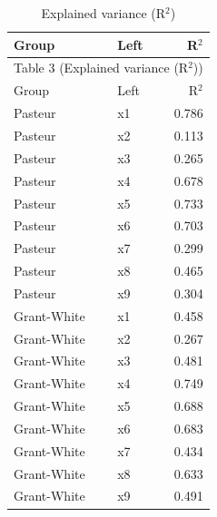 \documentclass[11pt]{article}
\begin{document}
\small
\begin{longtable}{llr}
\caption{Explained variance (R$^{2}$)}\\
\toprule
Group & Left & R$^{2}$ \\
\midrule
\endfirsthead
\multicolumn{3}{l}{Table 3 (Explained variance (R$^{2}$))} \\
\toprule
Group & Left & R$^{2}$ \\
\midrule
\endhead
Pasteur & x1 & 0.786 \\
Pasteur & x2 & 0.113 \\
Pasteur & x3 & 0.265 \\
Pasteur & x4 & 0.678 \\
Pasteur & x5 & 0.733 \\
Pasteur & x6 & 0.703 \\
Pasteur & x7 & 0.299 \\
Pasteur & x8 & 0.465 \\
Pasteur & x9 & 0.304 \\
Grant-White & x1 & 0.458 \\
Grant-White & x2 & 0.267 \\
Grant-White & x3 & 0.481 \\
Grant-White & x4 & 0.749 \\
Grant-White & x5 & 0.688 \\
Grant-White & x6 & 0.683 \\
Grant-White & x7 & 0.434 \\
Grant-White & x8 & 0.633 \\
Grant-White & x9 & 0.491 \\
\bottomrule
\end{longtable}
\end{document}
